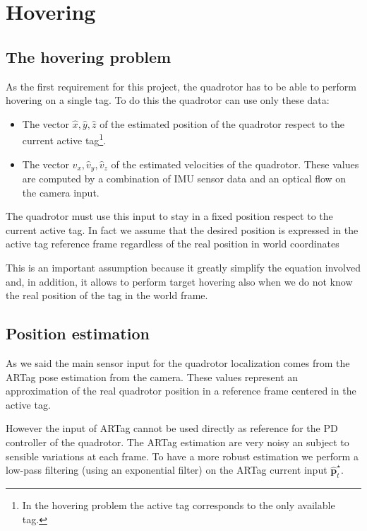 \section{Hovering}

\subsection{The hovering problem}

As the first requirement for this project, the quadrotor has to be able to
perform hovering on a single tag. To do this the quadrotor can use only these
data:

\begin{itemize} 
    \item The vector $\hat{x},\hat{y},\hat{z}$ of the estimated position of the
        quadrotor respect to the current active tag\footnote{In the hovering
        problem the active tag corresponds to the only available tag.}.
    \item The vector $\hat{v}_x, \hat{v}_y, \hat{v}_z$ of the estimated
        velocities of the quadrotor. These values are computed by a combination
        of IMU sensor data and an optical flow on the camera input.
\end{itemize}

The quadrotor must use this input to stay in a fixed position respect to the
current active tag. In fact we assume that the desired position is expressed in
the active tag reference frame regardless of the real position in world
coordinates 

This is an important assumption because it greatly simplify the equation
involved and, in addition, it allows to perform target hovering also when we do
not know the real position of the tag in the world frame.

\subsection{Position estimation}

As we said the main sensor input for the quadrotor localization comes from the
ARTag pose estimation from the camera. These values represent an approximation
of the real quadrotor position in a reference frame centered in the active tag.

However the input of ARTag cannot be used directly as reference for the PD
controller of the quadrotor. The ARTag estimation are very noisy an subject to
sensible variations at each frame. To have a more robust estimation we perform a 
low-pass filtering (using an exponential filter) on the ARTag current input
$\hat{\boldsymbol{p}}^{\star}_{t}$.

